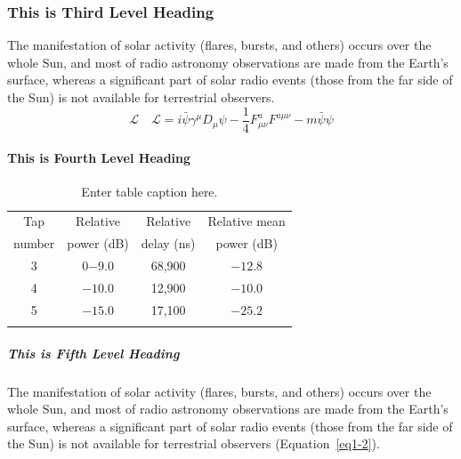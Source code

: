 \subsubsection{This is Third Level Heading}

The manifestation of solar activity (flares, bursts, and others) occurs over the whole Sun, and most of radio astronomy observations are made from the Earth's surface, whereas a significant part of solar radio events (those from the far side of the Sun) is not available for terrestrial observers.
\begin{equation}
\mathcal{L}\quad \mathbf{\mathcal{L}} = i \bar{\psi} \gamma^\mu D_\mu \psi -
\frac{1}{4} F_{\mu\nu}^a F^{a\mu\nu} - m \bar{\psi} \psi\label{eq1-2}
\end{equation}

\paragraph{This is Fourth Level Heading}

\lipsum[5]

\begin{table}
\caption{Enter table caption here.\label{tab1-1}}{%
\begin{tabular}{@{}cccc@{}}
\toprule
Tap     &Relative   &Relative   &Relative mean\\
number  &power (dB) &delay (ns) &power (dB)\\
\midrule
3 &0$-9.0$  &68,900\footnotemark[1] &$-12.8$\\
4 &$-10.0$ &12,900\footnotemark[2] &$-10.0$\\
5 &$-15.0$ &17,100 &$-25.2$\\
\botrule
\end{tabular}}{
}
\end{table}

\subparagraph{This is Fifth Level Heading}

\lipsum[6]

The manifestation of solar activity (flares, bursts, and others) occurs over the whole Sun, and most of radio astronomy observations are made from the Earth's surface, whereas a significant part of solar radio events (those from the far side of the Sun) is not available for terrestrial observers (Equation~\ref{eq1-2}).

